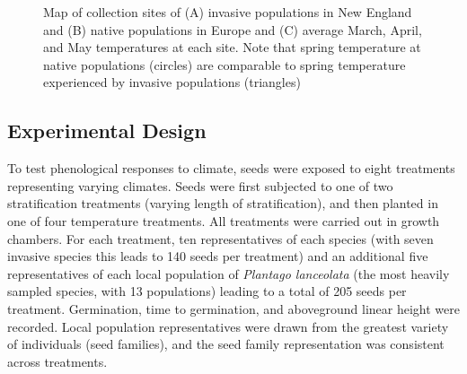\documentclass[12pt]{article}\usepackage[]{graphicx}\usepackage[]{color}
\begin{document}
	
	\begin{figure} 
		\centering
		\caption{Map of collection sites of (A) invasive populations in New England and (B) native populations in Europe and (C) average March, April, and May temperatures at each site. Note that spring temperature at native populations (circles) are comparable to spring temperature experienced by invasive populations (triangles)} %
		\label{fig:sites}
	\end{figure}

	\subsection{Experimental Design} %
	To test phenological responses to climate, seeds were exposed to eight treatments representing varying climates. Seeds were first subjected to one of two stratification treatments (varying length of stratification), and then planted in one of four temperature treatments. All treatments were carried out in growth chambers. For each treatment, ten representatives of each species (with seven invasive species this leads to 140 seeds per treatment) and an additional five representatives of each local population of \textit{Plantago lanceolata} (the most heavily sampled species, with 13 populations) leading to a total of 205 seeds per treatment. Germination, time to germination, and aboveground linear height were recorded. Local population representatives were drawn from the greatest variety of individuals (seed families), and the seed family representation was consistent across treatments. 
	
\end{document}
